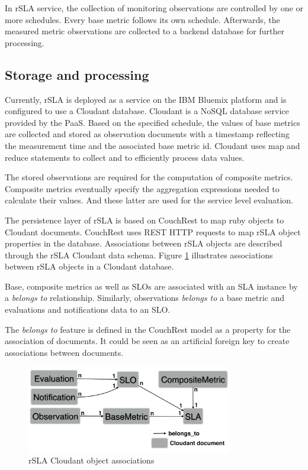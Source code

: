 In rSLA service, the collection of monitoring observations are controlled by one or more schedules. Every base metric follows its own schedule. Afterwards, the measured metric 
observations are collected to a backend database for further processing. 
\subsection{Storage and processing}
Currently, rSLA is deployed as a service on the IBM Bluemix platform \cite{bluemix} and is configured to use a Cloudant \cite{cloudant} database. Cloudant is a NoSQL database 
service provided by the PaaS. Based on the specified schedule, the values of base metrics are collected and stored as observation documents with a timestamp reflecting the 
measurement time and the associated base metric id. Cloudant uses map and reduce statements to collect and to efficiently process data values. 

The stored observations are required for the computation of composite metrics. Composite metrics eventually specify the aggregation expressions needed to calculate their values. 
And these latter are used for the service level evaluation. 

The persistence layer of rSLA is based on CouchRest \cite{couchrest} to map ruby objects to Cloudant documents. CouchRest  uses REST HTTP requests to map rSLA object properties in 
the database. Associations between rSLA objects are described through the rSLA Cloudant data schema. Figure \ref{schema} illustrates  associations between rSLA objects in a 
Cloudant database.

Base, composite metrics as well as SLOs are associated with an SLA instance by a \textit{belongs to} relationship. Similarly, observations \textit{belongs to} a base 
metric and evaluations and notifications data to an SLO. 

The \textit{belongs to} feature is defined in the CouchRest model as a property for the association of documents. It could be seen as an artificial foreign 
key to create associations between documents.  %

\begin{figure}
\centering
\includegraphics[width=0.8\textwidth]{pics/schema}
\caption{\label{schema} rSLA Cloudant object associations}
\end{figure}

